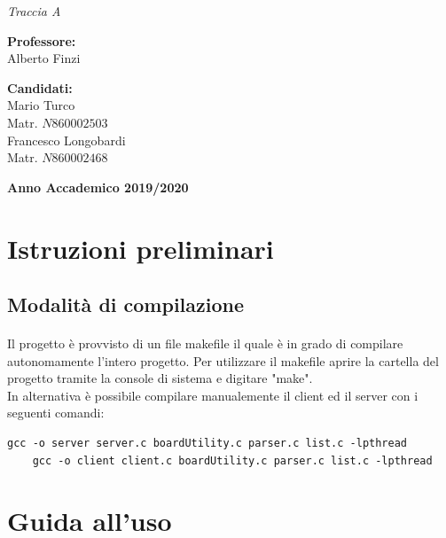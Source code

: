 \documentclass[a4paper]{article}
\begin{document}
\begin{titlepage}
\begin{center}
    {{ \textit{Traccia A}}}
\end{center}
\vspace{25mm}
\par
\noindent
\begin{minipage}[t]{0.47\textwidth}
    \textbf{Professore:}\\
    Alberto Finzi\\   
\end{minipage}
\hfill
\begin{minipage}[t]{0.47\textwidth}\raggedleft
    \textbf{Candidati:}\\
    Mario Turco\\ 
    Matr. $N860002503$\\
    Francesco Longobardi\\
    Matr.  $N860002468$\\
\end{minipage}
\vspace{5.5mm}
\begin{center}
    {\large{\bf Anno Accademico 2019/2020}} 
\end{center}
\end{titlepage}

\thispagestyle{empty}\null\newpage
\tableofcontents
\newpage
{}
\section{Istruzioni preliminari}
\subsection{Modalità di compilazione}
\paragraph{}
Il progetto è provvisto di un file makefile il quale è in grado di compilare autonomamente l'intero progetto.
Per utilizzare il makefile aprire la cartella del progetto tramite la console di sistema e digitare "make".\\
In alternativa è possibile compilare manualemente il client ed il server con i seguenti comandi:
\begin{Verbatim}[fontsize=\small]
    gcc -o server server.c boardUtility.c parser.c list.c -lpthread
    gcc -o client client.c boardUtility.c parser.c list.c -lpthread
\end{Verbatim}
\section{Guida all'uso }
\end{document}
